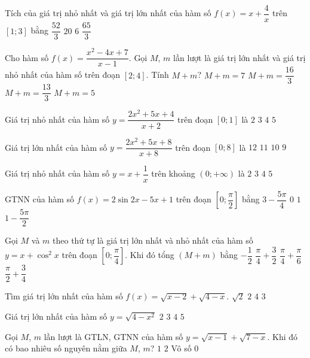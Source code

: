 \begin{ex}%
	Tích của giá trị nhỏ nhất và giá trị lớn nhất của hàm số $f(x)=x+\dfrac{4}{x}$ trên $[1;3]$ bằng
	\choice
	{$\dfrac{52}{3}$}
	{\True $20$}
	{$6$}
	{$\dfrac{65}{3}$}
\end{ex}
\begin{ex}%
	Cho hàm số $f(x)=\dfrac{x^2-4x+7}{x-1}$. Gọi $M$, $m$ lần lượt là giá trị lớn nhất và giá trị nhỏ nhất của hàm số trên đoạn $[2; 4]$. Tính $M+m$?
	\choice
	{$M+m=7$}
	{$M+m=\dfrac{16}{3}$}
	{$M+m=\dfrac{13}{3}$}
	{\True $M+m=5$}
\end{ex}
\begin{ex}%
	Giá trị nhỏ nhất của hàm số $y=\dfrac{2x^2+5x+4}{x+2}$ trên đoạn $[0;1]$ là 
	\choice
	{\True $2$}
	{$3$}
	{$4$}
	{$5$}
\end{ex}
\begin{ex}%
	Giá trị lớn nhất của hàm số $y=\dfrac{2x^2+5x+8}{x+8}$ trên đoạn $[0;8]$ là 
	\choice
	{$12$}
	{\True $11$}
	{$10$}
	{$9$}
\end{ex}
\begin{ex}%
	Giá trị nhỏ nhất của hàm số $y=x+\dfrac{1}{x}$ trên khoảng $(0;+\infty)$ là 
	\choice
	{\True $2$}
	{$3$}
	{$4$}
	{$5$}
\end{ex}
\begin{ex}%
	GTNN của hàm số $f(x)=2\sin 2x-5x+1$ trên đoạn $\left[0;\dfrac{\pi}{2}\right]$ bằng 
	\choice
	{$3-\dfrac{5\pi}{4}$}
	{$0$}
	{$1$}
	{\True $1-\dfrac{5\pi}{2}$}
\end{ex}
\begin{ex}%
	Gọi $M$ và $m$ theo thứ tự là giá trị lớn nhất và nhỏ nhất của hàm số $y=x+\cos^2x$ trên đoạn $\left[0;\dfrac{\pi}{4}\right]$. Khi đó tổng $(M+m)$ bằng
	\choice
	{$-\dfrac{1}{2}$}
	{\True $\dfrac{\pi}{4}+\dfrac{3}{2}$}
	{$\dfrac{\pi}{4}+\dfrac{\pi}{6}$}
	{$\dfrac{\pi}{2}+\dfrac{3}{4}$}
\end{ex}
\begin{ex}%
	Tìm giá trị lớn nhất của hàm số $f(x)=\sqrt{x-2}+\sqrt{4-x}$. 
	\choice
	{$\sqrt{2}$}
	{\True $2$}
	{$4$}
	{$3$}
\end{ex}
\begin{ex}%
	Giá trị lớn nhất của hàm số $y=\sqrt{4-x^2}$ 
	\choice
	{\True $2$}
	{$3$}
	{$4$}
	{$5$}
\end{ex}
\begin{ex}%
	Gọi $M$, $m$ lần lượt là GTLN, GTNN của hàm số $y=\sqrt{x-1}+\sqrt{7-x}$. Khi đó có bao nhiêu số nguyên nằm giữa $M$, $m$?
	\choice
	{\True $1$}
	{$2$}
	{Vô số}
	{$0$}
\end{ex}

